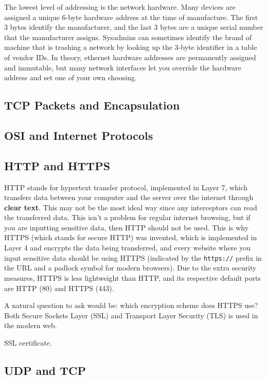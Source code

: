 \documentclass{article}
\theoremstyle{definition}
\begin{document}
      The lowest level of addressing is the network hardware. Many devices are assigned a unique 6-byte hardware address at the time of manufacture. The first 3 bytes identify the manufacturer, and the last 3 bytes are a unique serial number that the manufacturer assigns. Sysadmins can sometimes identify the brand of machine that is trashing a network by looking up the 3-byte identifier in a table of vendor IDs. In theory, ethernet hardware addresses are permanently assigned and immutable, but many network interfaces let you override the hardware address and set one of your own choosing. 

  \subsection{TCP Packets and Encapsulation}

  \subsection{OSI and Internet Protocols}
  

  \subsection{HTTP and HTTPS} 

    HTTP stands for hypertext transfer protocol, implemented in Layer 7, which transfers data between your computer and the server over the internet through \textbf{clear text}. This may not be the most ideal way since any interceptors can read the transferred data. This isn't a problem for regular internet browsing, but if you are inputting sensitive data, then HTTP should not be used. This is why HTTPS (which stands for secure HTTP) was invented, which  is implemented in Layer 4 and encrypts the data being transferred, and every website where you input sensitive data should be using HTTPS (indicated by the \texttt{https://} prefix in the URL and a padlock symbol for modern browsers). Due to the extra security measures, HTTPS is less lightweight than HTTP, and its respective default ports are HTTP (80) and HTTPS (443).  

    A natural question to ask would be: which encryption scheme does HTTPS use? Both Secure Sockets Layer (SSL) and Transport Layer Security (TLS) is used in the modern web. 

    SSL certificate. 

    
  \subsection{UDP and TCP}
\end{document}
